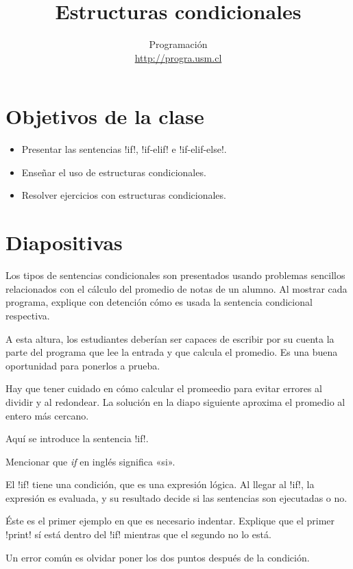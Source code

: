 \documentclass[10pt]{article}
\title{Estructuras condicionales}
\author{Programación \\ \url{http://progra.usm.cl}}
\date{}
\begin{document}
  \maketitle

  \section*{Objetivos de la clase}
  \begin{itemize}
    \item Presentar las sentencias \li!if!, \li!if-elif! e \li!if-elif-else!.
    \item Enseñar el uso de estructuras condicionales.
    \item Resolver ejercicios con estructuras condicionales.
  \end{itemize}

  \section*{Diapositivas}

  Los tipos de sentencias condicionales
  son presentados usando problemas sencillos
  relacionados con el cálculo del promedio de notas de un alumno.
  Al mostrar cada programa,
  explique con detención cómo es usada la sentencia condicional respectiva.


  A esta altura, los estudiantes deberían ser capaces
  de escribir por su cuenta
  la parte del programa que lee la entrada y que calcula el promedio.
  Es una buena oportunidad para ponerlos a prueba.

  Hay que tener cuidado en cómo calcular el promeedio
  para evitar errores al dividir y al redondear.
  La solución en la diapo siguiente
  aproxima el promedio al entero más cercano.


  Aquí se introduce la sentencia \li!if!.

  Mencionar que \emph{if} en inglés significa «si».

  El \li!if! tiene una condición,
  que es una expresión lógica.
  Al llegar al \li!if!, la expresión es evaluada,
  y su resultado decide si las sentencias son ejecutadas o no.

  Éste es el primer ejemplo
  en que es necesario indentar.
  Explique que el primer \li!print! sí está dentro del \li!if!
  mientras que el segundo no lo está.

  Un error común es olvidar poner los dos puntos después de la condición.
\end{document}
